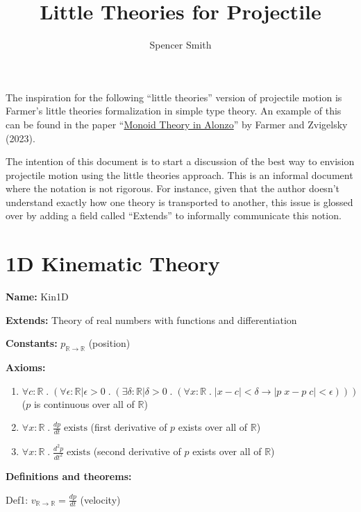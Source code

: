\documentclass{article}
\title{Little Theories for Projectile}
\author{Spencer Smith}
\begin{document}
\maketitle

The inspiration for the following ``little theories'' version of projectile
motion is Farmer's little theories formalization in simple type theory.  An
example of this can be found in the paper
``\href{https://imps.mcmaster.ca/doc/monoids.pdf} {Monoid Theory in Alonzo}'' by
Farmer and Zvigelsky (2023).

The intention of this document is to start a discussion of the best way to
envision projectile motion using the little theories approach.  This is an
informal document where the notation is not rigorous.  For instance, given that
the author doesn't understand exactly how one theory is transported to another,
this issue is glossed over by adding a field called ``Extends'' to informally
communicate this notion.

\section{1D Kinematic Theory}

\noindent \textbf{Name:} Kin1D

\noindent \textbf{Extends:} Theory of real numbers with functions and differentiation

\noindent \textbf{Constants:} $p_{\mathbb{R} \rightarrow \mathbb{R}}$ (position)

\noindent \textbf{Axioms:}

\begin{enumerate}
    \item $\forall c: \mathbb{R} \; . \; (\forall \epsilon: \mathbb{R} |
    \epsilon > 0 \; . \; (\exists \delta : \mathbb{R} | \delta > 0 \; . \;
    (\forall x: \mathbb{R} \; . \; | x - c | < \delta \rightarrow |p \; x - p \;
    c | < \epsilon)))$ ($p$ is continuous over all of $\mathbb{R}$)
    \item $\forall x: \mathbb{R} \; . \; \frac{dp} {dt} \; \text{exists}$ (first derivative of $p$ exists over all of $\mathbb{R}$)
    \item $\forall x: \mathbb{R} \; . \; \frac{d^2 p} {d t^2} \; \text{exists}$ (second derivative of $p$ exists over all of $\mathbb{R}$)
\end{enumerate}

\noindent \textbf{Definitions and theorems:}

Def1: $v_{\mathbb{R} \rightarrow \mathbb{R}} = \frac{dp}{dt}$ (velocity)
\end{document}
